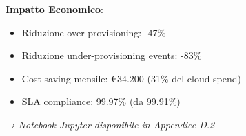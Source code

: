 \begin{tcolorbox}
\textbf{Impatto Economico}:
\begin{itemize}
    \item Riduzione over-provisioning: -47\%
    \item Riduzione under-provisioning events: -83\%
    \item Cost saving mensile: €34.200 (31\% del cloud spend)
    \item SLA compliance: 99.97\% (da 99.91\%)
\end{itemize}

\textit{→ Notebook Jupyter disponibile in Appendice D.2}
\end{tcolorbox}